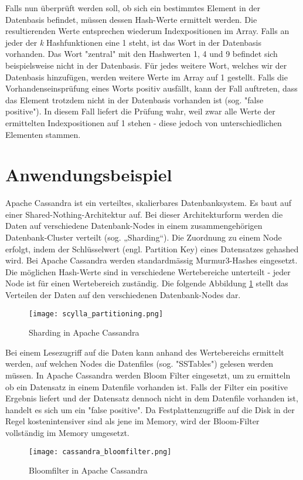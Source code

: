 \documentclass[10pt, a4paper, twocolumn]{article} %
\begin{document}
Falls nun überprüft werden soll, ob sich ein bestimmtes Element in der Datenbasis befindet, müssen dessen Hash-Werte ermittelt werden.
Die resultierenden Werte entsprechen wiederum Indexpositionen im Array. Falls an jeder der \textit{k} Hashfunktionen eine 1 steht, ist das Wort in der Datenbasis vorhanden.
Das Wort "zentral" mit den Hashwerten 1, 4 und 9 befindet sich beispielsweise nicht in der Datenbasis. Für jedes weitere Wort, welches wir der Datenbasis hinzufügen, werden weitere Werte im Array auf 1 gestellt.
Falls die Vorhandenseinsprüfung eines Worts positiv ausfällt, kann der Fall auftreten, dass das Element trotzdem nicht in der Datenbasis vorhanden ist (sog. "false positive").
In diesem Fall liefert die Prüfung wahr, weil zwar alle Werte der ermittelten Indexpositionen auf 1 stehen - diese jedoch von unterschiedlichen Elementen stammen.

\section{Anwendungsbeispiel}
\label{anwendung}
Apache  Cassandra  ist  ein  verteiltes,  skalierbares  Datenbanksystem. Es baut auf einer Shared-Nothing-Architektur auf. Bei dieser
Architekturform werden die Daten auf verschiedene Datenbank-Nodes in einem zusammengehörigen Datenbank-Cluster verteilt (sog. „Sharding“).
Die Zuordnung zu einem Node erfolgt, indem der Schlüsselwert (engl. Partition Key) eines Datensatzes gehashed wird. Bei Apache Cassandra werden standardmässig Murmur3-Hashes eingesetzt.
Die möglichen Hash-Werte sind in verschiedene Wertebereiche unterteilt - jeder Node ist für einen Wertebereich zuständig. Die folgende Abbildung \ref{scylla_ring} stellt das Verteilen der Daten auf den verschiedenen Datenbank-Nodes dar.

\begin{figure}[H]
	\texttt{[image: scylla\_partitioning.png]} %
	\caption{Sharding in Apache Cassandra} %
	\label{scylla_ring} %
\end{figure}

\newpage
Bei einem Lesezugriff auf die Daten kann anhand des Wertebereichs ermittelt werden, auf welchen Nodes die Datenfiles (sog. "SSTables") gelesen werden müssen. In Apache Cassandra werden Bloom Filter eingesetzt, um zu ermitteln ob ein Datensatz in einem Datenfile vorhanden ist. Falls der Filter ein positive Ergebnis liefert und der Datensatz dennoch nicht in dem Datenfile vorhanden ist, handelt es sich um ein "false positive". Da Festplattenzugriffe auf die Disk in der Regel kostenintensiver sind als jene im Memory, wird der Bloom-Filter vollständig im Memory umgesetzt.
\begin{figure}
	\texttt{[image: cassandra\_bloomfilter.png]} %
	\caption{Bloomfilter in Apache Cassandra} %
	\label{cassandra_bloomfilter} %
\end{figure}
\end{document}
